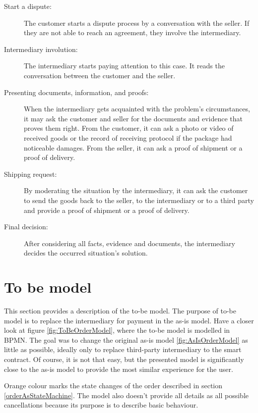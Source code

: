 \documentclass[thesis=M,english]{FITthesis}[2019/12/23]
\begin{document}
\begin{description}

\item[Start a dispute:] The customer starts a dispute process by a conversation with the seller. If they are not able to reach an agreement, they involve the intermediary.

\item[Intermediary involution:] The intermediary starts paying attention to this case. It reads the conversation between the customer and the seller. 

\item [Presenting documents, information, and proofs:] When the intermediary gets acquainted with the problem's circumstances, it may ask the customer and seller for the documents and evidence that proves them right. From the customer, it can ask a photo or video of received goods or the record of receiving protocol if the package had noticeable damages. From the seller, it can ask a proof of shipment or a proof of delivery. 

\item[Shipping request:] By moderating the situation by the intermediary, it can ask the customer to send the goods back to the seller, to the intermediary or to a third party and provide a proof of shipment or a proof of delivery. 

\item [Final decision:] After considering all facts, evidence and documents, the intermediary decides the occurred situation's solution.
\end{description}

\label{tobeModel}
\section{To be model}
This section provides a description of the to-be model. The purpose of to-be model is to replace the intermediary for payment in the as-is model. Have a closer look at figure \ref{fig:ToBeOrderModel}, where the to-be model is modelled in BPMN. The goal was to change the original as-is model \ref{fig:AsIsOrderModel} as little as possible, ideally only to replace third-party intermediary to the smart contract. Of course, it is not that easy, but the presented model is significantly close to the as-is model to provide the most similar experience for the user. 

Orange colour marks the state changes of the order described in section \ref{orderAsStateMachine}. The model also doesn't provide all details as all possible cancellations because its purpose is to describe basic behaviour.
\end{document}
